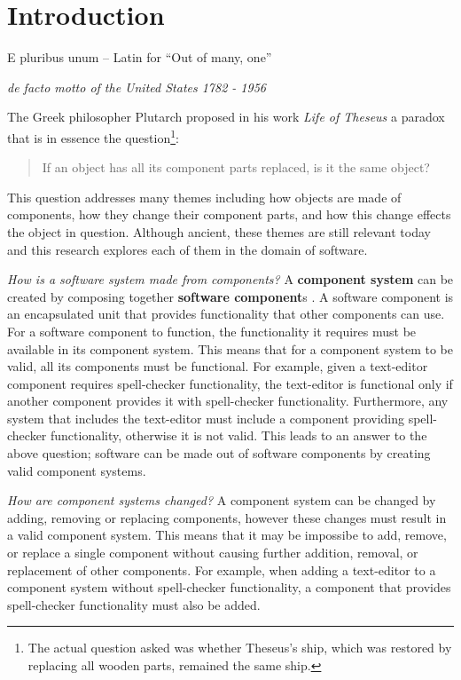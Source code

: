 \chapter{Introduction}
\label{introduction}
\epigraph{E pluribus unum -- Latin for ``Out of many, one''}
{\textit{de facto motto of the United States 1782 - 1956}}
The Greek philosopher Plutarch proposed in his work \textit{Life of Theseus} a paradox that is in essence the question\footnote{The actual question asked was whether Theseus's ship, which was restored by replacing all wooden parts, remained the same ship.}:
\begin{quote}
If an object has all its component parts replaced, is it the same object?
\end{quote}
This question addresses many themes including how objects are made of components, how they change their component parts,
and how this change effects the object in question.
Although ancient, 
these themes are still relevant today and this research explores each of them in the domain of software.

\textit{How is a software system made from components?}
A \textbf{component system} can be created by composing together \textbf{software component}s \citep{Szyperski2002}.
A software component is an encapsulated unit that provides functionality that other components can use.
For a software component to function, the functionality it requires must be available in its component system.
This means that for a component system to be valid, all its components must be functional.
For example, given a text-editor component requires spell-checker functionality, 
the text-editor is functional only if another component provides it with spell-checker functionality.
Furthermore, any system that includes the text-editor must include a component providing spell-checker functionality, otherwise it is not valid.
This leads to an answer to the above question; software can be made out of software components by creating valid component systems.

\textit{How are component systems changed?}
A component system can be changed by adding, removing or replacing components, however these changes must result in a valid component system.
This means that it may be impossibe to add, remove, or replace a single component without causing further addition, removal, or replacement of other components.
For example, when adding a text-editor to a component system without spell-checker functionality, a component that provides spell-checker functionality must also be added.

